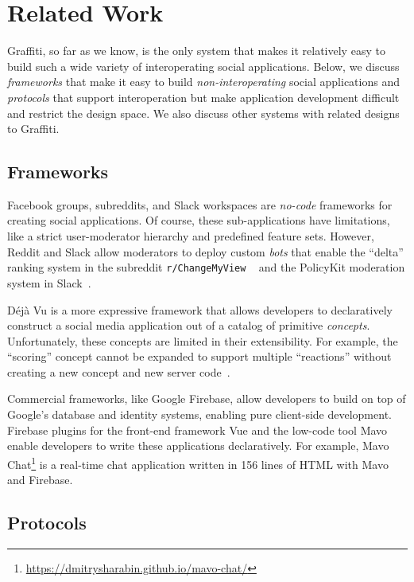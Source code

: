 \section{Related Work}
\label{related-work}

Graffiti, so far as we know, is the only system that makes it
relatively easy to build such a wide variety of interoperating social applications.
Below, we discuss \emph{frameworks} that make it easy to build
\emph{non-\allowbreak{}interoperating} social applications
and \emph{protocols} that support interoperation but
make application development difficult and restrict the design space.
We also discuss other systems with related designs to Graffiti.

\subsection{Frameworks}

Facebook groups, subreddits, and
Slack workspaces are \emph{no-code} frameworks for creating social
applications.
Of course, these sub-applications have limitations,
like a strict user-moderator hierarchy
and predefined feature sets.
However, Reddit and Slack allow moderators to deploy
custom \emph{bots} that enable the
``delta'' ranking system in the subreddit \texttt{r/Change\allowbreak{}My\allowbreak{}View}
~\cite{changemyview}
and the PolicyKit moderation system in Slack~\cite{policykit}.

Déjà Vu is a more expressive framework that allows developers
to declaratively construct a social media application out
of a catalog of primitive \emph{concepts}.
Unfortunately, these concepts are limited in their extensibility.
For example, the ``scoring'' concept cannot be expanded
to support multiple ``reactions''
without creating a new concept and new server code~\cite{dejavu}.

Commercial frameworks, like Google Firebase, allow developers
to build on top of Google's database and identity systems,
enabling pure client-side development.
Firebase plugins for the front-end framework Vue and the low-code tool
Mavo~\cite{mavo} enable developers to write these applications declaratively.
For example, Mavo Chat\footnote{
    \url{https://dmitrysharabin.github.io/mavo-chat/}
} is a real-time chat application written in 156 lines of HTML
with Mavo and Firebase.

\subsection{Protocols}
\label{related-work:protocols}

